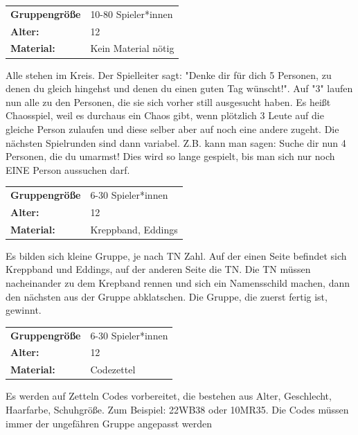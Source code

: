 \begin{table}[H]
\begin{tabular}{>{\bfseries}lp{8cm}}
   Gruppengröße   & 10-80 Spieler*innen\\
    Alter: & 12 \\
    Material: & Kein Material nötig\\ 
\end{tabular}
\end{table} 
Alle stehen im Kreis. Der Spielleiter sagt: "Denke dir für dich 5 Personen, zu denen du gleich hingehst und denen du einen guten Tag wünscht!". Auf "3" laufen nun alle zu den Personen, die sie sich vorher still ausgesucht haben. Es heißt Chaosspiel, weil es durchaus ein Chaos gibt, wenn plötzlich 3 Leute auf die gleiche Person zulaufen und diese selber aber auf noch eine andere zugeht. Die nächsten Spielrunden sind dann variabel. Z.B. kann man sagen: Suche dir nun 4 Personen, die du umarmst! Dies wird so lange gespielt, bis man sich nur noch EINE Person aussuchen darf.\\


\newpage
\begin{table}[H]
\begin{tabular}{>{\bfseries}lp{8cm}}
   Gruppengröße   & 6-30 Spieler*innen\\
    Alter: & 12 \\
    Material: & Kreppband, Eddings \\
\end{tabular}
\end{table} 

Es bilden sich kleine Gruppe, je nach TN Zahl.  Auf der einen Seite befindet sich Kreppband und Eddings, auf der anderen Seite die TN. Die TN müssen nacheinander zu dem Krepband rennen und sich ein Namensschild machen, dann den nächsten aus der Gruppe abklatschen. Die Gruppe, die zuerst fertig ist, gewinnt.\\



\begin{tabularx}{\textwidth}{>{\bfseries}lX}
   Gruppengröße   & 6-30 Spieler*innen\\
    Alter: & 12 \\
    Material: & Codezettel\\ \end{tabularx}
Es werden auf Zetteln Codes vorbereitet, die bestehen aus Alter, Geschlecht, Haarfarbe, Schuhgröße. Zum Beispiel: 22WB38 oder 10MR35. Die Codes müssen immer der ungefähren Gruppe angepasst werden\\



